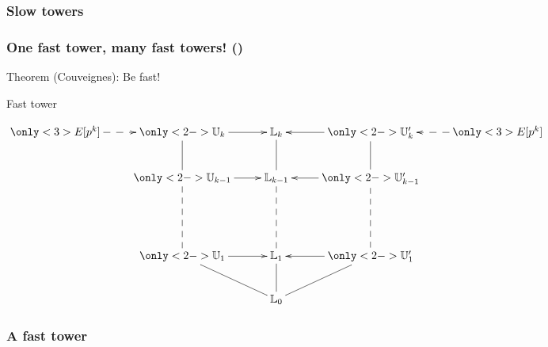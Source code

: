 \documentclass[10pt,usepdftitle=false]{beamer}
\begin{document}

\begin{frame}
  \frametitle{Slow towers}
  
\end{frame}


\begin{frame}
  \frametitle{One fast tower, many fast towers! (\cite{couveignes00})}
  
  Theorem (Couveignes): Be fast!
  
  \begin{center}
    Fast tower

    \bigskip

    \Large$\xymatrix{
      \only<3>{E[p^k]\ar@{-->}[r]} & \only<2->{\U_k \ar@{-}[d]\ar[r]}      & \LK_k \ar@{-}[d]      & \only<2->{\U_k' \ar@{-}[d]\ar[l]}& \only<3>{E[p^k]\ar@{-->}[l]}\\
      &\only<2->{\U_{k-1} \ar@{--}[dd]\ar[r]} & \LK_{k-1} \ar@{--}[dd] & \only<2->{\U_{k-1}' \ar@{--}[dd]\ar[l]}\\
      \\
      &\only<2->{\U_1 \ar@{-}[dr]\ar[r]}     & \LK_1 \ar@{-}[d]      & \only<2->{\U_1' \ar@{-}[dl]\ar[l]}\\
      &                    &\LK_0
    }$
  \end{center}
\end{frame}


\begin{frame}
  \frametitle{A fast tower}

\end{frame}

\end{document}
